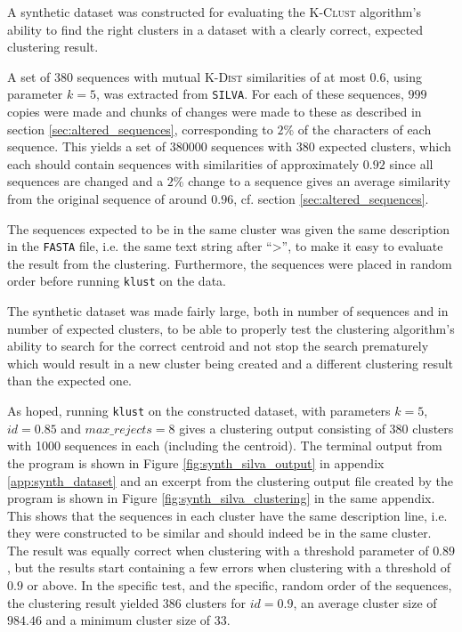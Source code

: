 A synthetic dataset was constructed for evaluating the \textsc{K-Clust}
algorithm's ability to find the right clusters in a dataset with a clearly
correct, expected clustering result.

A set of $380$ sequences with mutual \textsc{K-Dist} similarities of at most
$0.6$, using parameter $k=5$, was extracted from \texttt{SILVA}. For each of
these sequences, $999$ copies were made and chunks of changes were made to
these as described in section \ref{sec:altered_sequences}, corresponding to
$2$\% of the characters of each sequence. This yields a set of \num{380000}
sequences with $380$ expected clusters, which each should contain sequences
with similarities of approximately $0.92$ since all sequences are changed and a
$2$\% change to a sequence gives an average similarity from the original
sequence of around $0.96$, cf. section \ref{sec:altered_sequences}.

The sequences expected to be in the same cluster was given the same description
in the \texttt{FASTA} file, i.e. the same text string after ``>'', to make it
easy to evaluate the result from the clustering. Furthermore, the sequences
were placed in random order before running \texttt{klust} on the data.

The synthetic dataset was made fairly large, both in number of sequences and in
number of expected clusters, to be able to properly test the clustering
algorithm's ability to search for the correct centroid and not stop the search
prematurely which would result in a new cluster being created and a different
clustering result than the expected one.

As hoped, running \texttt{klust} on the constructed dataset, with parameters
$k=5$, $id=0.85$ and $max\_rejects=8$ gives a clustering output consisting of
$380$ clusters with 1000 sequences in each (including the centroid). The
terminal output from the program is shown in Figure
\ref{fig:synth_silva_output} in appendix \ref{app:synth_dataset} and an excerpt
from the clustering output file created by the program is shown in Figure
\ref{fig:synth_silva_clustering} in the same appendix. This shows that the
sequences in each cluster have the same description line, i.e. they were
constructed to be similar and should indeed be in the same cluster. The result
was equally correct when clustering with a threshold parameter of $0.89$, but
the results start containing a few errors when clustering with a threshold of
$0.9$ or above. In the specific test, and the specific, random order of the
sequences, the clustering result yielded $386$ clusters for $id=0.9$, an
average cluster size of $984.46$ and a minimum cluster size of $33$.

